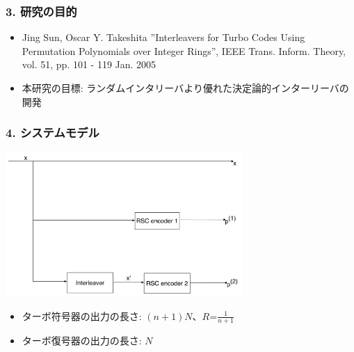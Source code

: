 \documentclass{beamer}  %
\begin{document}
\begin{frame}
\frametitle{3. 研究の目的}
\begin{itemize}
\setlength\itemsep{2em}
\item Jing Sun, Oscar Y. Takeshita ”Interleavers for Turbo Codes Using Permutation Polynomials over Integer Rings”, IEEE Trans. Inform. Theory, vol. 51,
pp. 101 - 119 Jan. 2005

\item 本研究の目標: ランダムインタリーバより優れた決定論的インターリーバの開発

\end{itemize}
\end{frame}


\begin{frame}
\frametitle{4. システムモデル}
\begin{center}
		\includegraphics[width=9cm]{TurboEncoder.pdf}
	\end{center}
	
	\begin{itemize}
	\setlength\itemsep{2em}
	\item ターボ符号器の出力の長さ: $(n+1)N$、$R$=$\frac{1}{n+1}$
	
	\item ターボ復号器の出力の長さ: $N$
	
	\end{itemize}


\end{frame}
\end{document}
